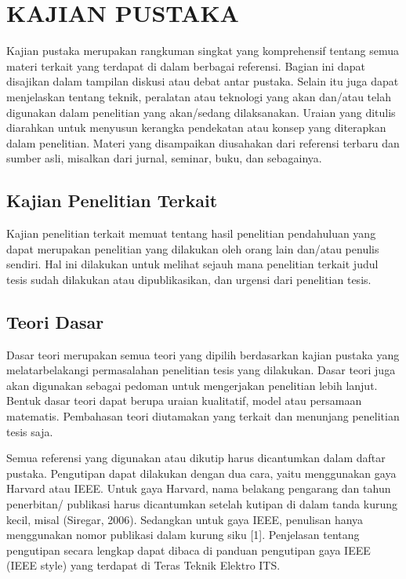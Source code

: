 \chapter{KAJIAN PUSTAKA}

Kajian pustaka merupakan rangkuman singkat yang komprehensif tentang semua materi terkait yang terdapat di dalam berbagai referensi. Bagian ini dapat disajikan dalam tampilan diskusi atau debat antar pustaka. Selain itu juga dapat menjelaskan tentang teknik, peralatan atau teknologi yang akan dan/atau telah digunakan dalam penelitian yang akan/sedang dilaksanakan. Uraian yang ditulis diarahkan untuk menyusun kerangka pendekatan atau konsep yang diterapkan dalam penelitian. Materi yang disampaikan diusahakan dari referensi terbaru dan sumber asli, misalkan dari jurnal, seminar, buku, dan sebagainya.

\section{Kajian Penelitian Terkait}

Kajian penelitian terkait memuat tentang hasil penelitian pendahuluan yang dapat merupakan penelitian yang dilakukan oleh orang lain dan/atau penulis sendiri. Hal ini dilakukan untuk melihat sejauh mana penelitian terkait judul tesis sudah dilakukan atau dipublikasikan, dan urgensi dari penelitian tesis.

\section{Teori Dasar}

Dasar teori merupakan semua teori yang dipilih berdasarkan kajian pustaka yang melatarbelakangi permasalahan penelitian tesis yang dilakukan. Dasar teori juga akan digunakan sebagai pedoman untuk mengerjakan penelitian lebih lanjut. Bentuk dasar teori dapat berupa uraian kualitatif, model atau persamaan matematis. Pembahasan teori diutamakan yang terkait dan menunjang penelitian tesis saja.

Semua referensi yang digunakan atau dikutip harus dicantumkan dalam daftar pustaka. Pengutipan dapat dilakukan dengan dua cara, yaitu menggunakan gaya Harvard atau IEEE. Untuk gaya Harvard, nama belakang pengarang dan tahun penerbitan/ publikasi harus dicantumkan setelah kutipan di dalam tanda kurung kecil, misal (Siregar, 2006). Sedangkan untuk gaya IEEE, penulisan hanya menggunakan nomor publikasi dalam kurung siku [1]. Penjelasan tentang pengutipan secara lengkap dapat dibaca di panduan pengutipan gaya IEEE (IEEE style) yang terdapat di Teras Teknik Elektro ITS.


